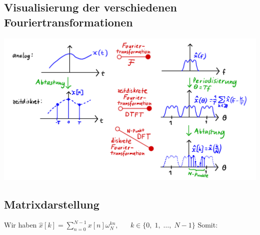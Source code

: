 \documentclass[11pt]{article}
\begin{document}
%

\subsection*{Visualisierung der verschiedenen Fouriertransformationen}
\vspace*{-0.5cm}
\begin{center}
    \includegraphics[width=0.8\linewidth]{docimgs/DFT_visuals.jpeg}
\end{center}

\vspace*{-1.5cm}
\subsection*{Matrixdarstellung}
\vspace*{-0.5cm}
Wir haben $\hat{x}[k] = \displaystyle\sum_{n=0}^{N-1} x[n]\omega_N^{kn}, \hspace{20pt} k \in \{ 0, \; 1, \; \dots, \; N-1 \}$ Somit:
\end{document}
